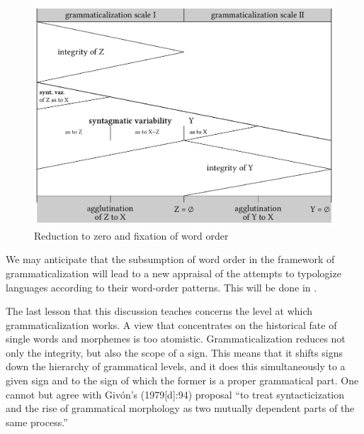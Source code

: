 \begin{figure}
\includegraphics[width=\textwidth]{figures/12-reduction-to-zero.pdf}
	
\caption{Reduction to zero and fixation of word order}
\end{figure}


We may anticipate that the subsumption of word order in the framework of grammaticalization will lead to a new appraisal of the attempts to typologize languages according to their word-order patterns. This will be done in .

The last lesson that this discussion teaches concerns the level at which grammaticalization works. A view that concentrates on the historical fate of single words and morphemes is too atomistic. Grammaticalization reduces not only the integrity, but also the scope of a sign. This means that it shifts signs down the hierarchy of grammatical levels, and it does this simultaneously to a given sign and to the sign of which the former is a proper grammatical part. One cannot but agree with Givón's (1979[d]:94) proposal “to treat syntacticization and the rise of grammatical morphology as two mutually dependent parts of the same process.”